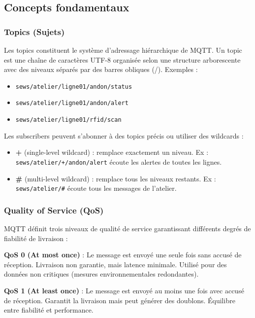
\subsection{Concepts fondamentaux}

\subsubsection{Topics (Sujets)}

Les topics constituent le système d'adressage hiérarchique de MQTT. Un topic est une chaîne de caractères UTF-8 organisée selon une structure arborescente avec des niveaux séparés par des barres obliques (/). Exemples :

\begin{itemize}
    \item \texttt{sews/atelier/ligne01/andon/status}
    \item \texttt{sews/atelier/ligne01/andon/alert}
    \item \texttt{sews/atelier/ligne01/rfid/scan}
\end{itemize}

Les subscribers peuvent s'abonner à des topics précis ou utiliser des wildcards :
\begin{itemize}
    \item \textbf{+} (single-level wildcard) : remplace exactement un niveau. Ex : \texttt{sews/atelier/+/andon/alert} écoute les alertes de toutes les lignes.
    \item \textbf{\#} (multi-level wildcard) : remplace tous les niveaux restants. Ex : \texttt{sews/atelier/\#} écoute tous les messages de l'atelier.
\end{itemize}


\subsubsection{Quality of Service (QoS)}

MQTT définit trois niveaux de qualité de service garantissant différents degrés de fiabilité de livraison :

\textbf{QoS 0 (At most once)} : Le message est envoyé une seule fois sans accusé de réception. Livraison non garantie, mais latence minimale. Utilisé pour des données non critiques (mesures environnementales redondantes).

\textbf{QoS 1 (At least once)} : Le message est envoyé au moins une fois avec accusé de réception. Garantit la livraison mais peut générer des doublons. Équilibre entre fiabilité et performance.

